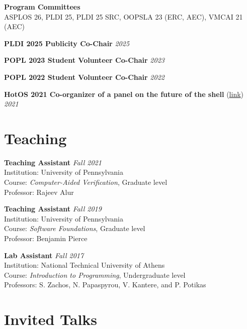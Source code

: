 \documentclass[margin]{res}
\begin{document}
\begin{resume}
\textbf{Program Committees} \\ %
ASPLOS 26, PLDI 25, PLDI 25 SRC, OOPSLA 23 (ERC, AEC), VMCAI 21 (AEC)


\textbf{PLDI 2025 Publicity Co-Chair}  \hfill {\em 2025}

\textbf{POPL 2023 Student Volunteer Co-Chair}  \hfill {\em 2023}


\textbf{POPL 2022 Student Volunteer Co-Chair}  \hfill {\em 2022}

\textbf{HotOS 2021 Co-organizer of a panel on the future of the shell} (\href{https://fut-shell.github.io/}{link})  \hfill {\em 2021}



\section{Teaching}
\hypertarget{sec:teaching}{}

\textbf{Teaching Assistant}  \hfill {\em Fall 2021} \\
Institution: University of Pennsylvania \\
Course: \textit{Computer-Aided Verification}, Graduate level \\
Professor: Rajeev Alur

\textbf{Teaching Assistant}  \hfill {\em Fall 2019} \\
Institution: University of Pennsylvania \\
Course: \textit{Software Foundations}, Graduate level \\
Professor: Benjamin Pierce

\textbf{Lab Assistant}  \hfill {\em Fall 2017} \\
Institution: National Technical University of Athens \\
Course: \textit{Introduction to Programming}, Undergraduate level \\
Professors: S. Zachos, N. Papaspyrou, V. Kantere, and P. Potikas


\section{Invited Talks}
\hypertarget{sec:talks}{}


\end{resume}
\end{document}

